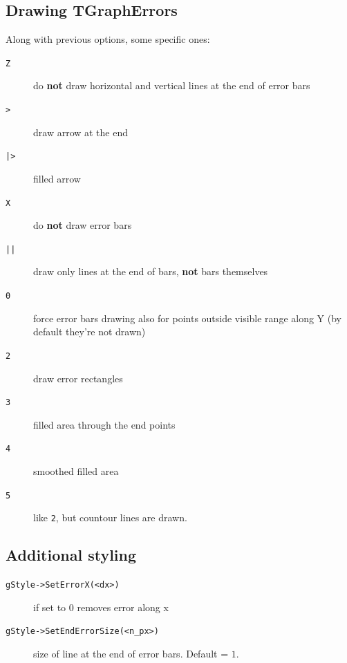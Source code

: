 \documentclass[10pt, twoside]{article}
\newcommand{\ttt}[1]{\colorbox{boxgray}{\texttt{#1}}}
\begin{document}
\subsection{Drawing TGraphErrors}
Along with previous options, some specific ones:
\begin{description}
\item[\ttt{Z}] do \textbf{not} draw horizontal and vertical lines at the end of error bars
\item[\ttt{>}] draw arrow at the end
\item[\ttt{|>}] filled arrow
\item[\ttt{X}] do \textbf{not} draw error bars
\item[\ttt{||}] draw only lines at the end of bars, \textbf{not} bars themselves
\item[\ttt{0}] force error bars drawing also for points outside visible range along Y (by default they're not drawn)
\item[\ttt{2}] draw error rectangles
\item[\ttt{3}] filled area through the end points
\item[\ttt{4}] smoothed filled area
\item[\ttt{5}] like \ttt{2}, but countour lines are drawn.

\end{description}
\subsection{Additional styling}
\begin{description}
\item[\ttt{gStyle->SetErrorX(<dx>)}] if set to $0$ removes error along x
\item[\ttt{gStyle->SetEndErrorSize(<n\_px>)}] size of line at the end of error bars. Default = $1$.
\end{description}
\end{document}
